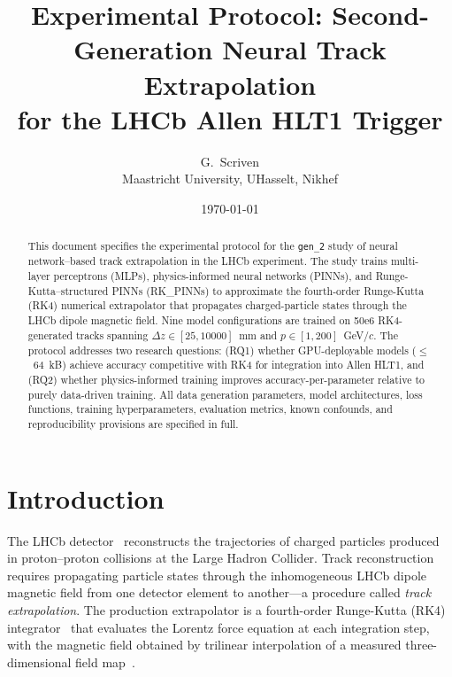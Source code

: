 \documentclass[a4paper,11pt]{article}
\newcommand{\SI}[2]{#1~#2}
\newcommand{\num}[1]{#1}
\newcommand{\kilo}{k}
\newcommand{\byte}{B}
\newcommand{\dz}{\Delta z}
\begin{document}
\title{Experimental Protocol: Second-Generation Neural Track Extrapolation\\
for the LHCb Allen HLT1 Trigger}

\author{G.~Scriven\\\small Maastricht University, UHasselt, Nikhef}

\date{\today}

\begin{abstract}
This document specifies the experimental protocol for the \texttt{gen\_2}
study of neural network--based track extrapolation in the LHCb experiment.
The study trains multi-layer perceptrons (MLPs), physics-informed neural
networks (PINNs), and Runge-Kutta--structured PINNs (RK\_PINNs) to
approximate the fourth-order Runge-Kutta (RK4) numerical extrapolator that
propagates charged-particle states through the LHCb dipole magnetic field.
Nine model configurations are trained on \num{50e6} RK4-generated tracks
spanning $\dz \in [25, 10000]$~mm and $p \in [1, 200]$~GeV/$c$.  The
protocol addresses two research questions: (RQ1) whether GPU-deployable
models ($\leq$~\SI{64}{\kilo\byte}) achieve accuracy competitive with RK4
for integration into Allen HLT1, and (RQ2) whether physics-informed
training improves accuracy-per-parameter relative to purely data-driven
training.  All data generation parameters, model architectures, loss
functions, training hyperparameters, evaluation metrics, known confounds,
and reproducibility provisions are specified in full.
\end{abstract}

\maketitle

\section{Introduction}
\label{sec:introduction}

The LHCb detector~\cite{LHCb_detector} reconstructs the trajectories of
charged particles produced in proton--proton collisions at the Large Hadron
Collider.  Track reconstruction requires propagating particle states
through the inhomogeneous LHCb dipole magnetic field from one detector
element to another---a procedure called \emph{track extrapolation}.  The
production extrapolator is a fourth-order Runge-Kutta (RK4)
integrator~\cite{RK4_extrapolator} that evaluates the Lorentz force
equation at each integration step, with the magnetic field obtained by
trilinear interpolation of a measured three-dimensional field
map~\cite{LHCb_field_map}.
\end{document}
